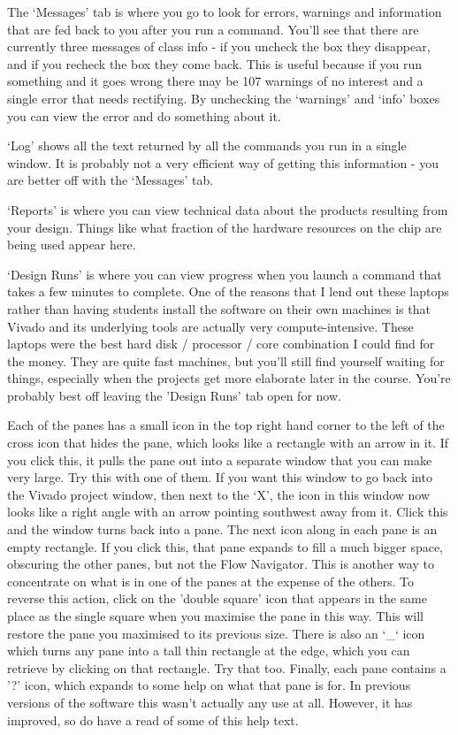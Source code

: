 \documentclass[../physical_computing.tex]{subfiles}
\begin{document}
The `Messages' tab is where you go to look for errors, warnings and information that are fed back to you after you run a command. You'll see that there are currently three messages of class info - if you uncheck the box they disappear, and if you recheck the box they come back. This is useful because if you run something and it goes wrong there may be 107 warnings of no interest and a single error that needs rectifying. By unchecking the `warnings' and `info' boxes you can view the error and do something about it.

`Log' shows all the text returned by all the commands you run in a single window. It is probably not a very efficient way of getting this information - you are better off with the `Messages' tab.

`Reports' is where you can view technical data about the products resulting from your design. Things like what fraction of the hardware resources on the chip are being used appear here.

`Design Runs' is where you can view progress when you launch a command that takes a few minutes to complete. One of the reasons that I lend out these laptops rather than having students install the software on their own machines is that Vivado and its underlying tools are actually very compute-intensive. These laptops were the best hard disk / processor / core combination I could find for the money. They are quite fast machines, but you'll still find yourself waiting for things, especially when the projects get more elaborate later in the course. You're probably best off leaving the 'Design Runs' tab open for now.

Each of the panes has a small icon in the top right hand corner to the left of the cross icon that hides the pane, which looks like a rectangle with an arrow in it. If you click this, it pulls the pane out into a separate window that you can make very large. Try this with one of them. If you want this window to go back into the Vivado project window, then next to the `X', the icon in this window now looks like a right angle with an arrow pointing southwest away from it. Click this and the window turns back into a pane. The next icon along in each pane is an empty rectangle. If you click this, that pane expands to fill a much bigger space, obscuring the other panes, but not the Flow Navigator. This is another way to concentrate on what is in one of the panes at the expense of the others. To reverse this action, click on the 'double square' icon that appears in the same place as the single square when you maximise the pane in this way. This will restore the pane you maximised to its previous size. There is also an `\_` icon which turns any pane into a tall thin rectangle at the edge, which you can retrieve by clicking on that rectangle. Try that too. Finally, each pane contains a '?' icon, which expands to some help on what that pane is for. In previous versions of the software this wasn't actually any use at all. However, it has improved, so do have a read of some of this help text.
\end{document}
